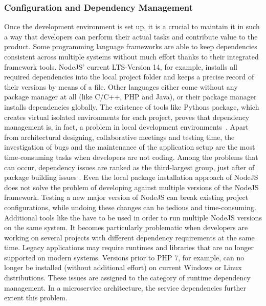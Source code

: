        \subsubsection{Configuration and Dependency Management}\label{sssec::dependency}
        Once the development environment is set up, it is a crucial to maintain it in such a way that developers can perform their actual tasks and contribute value to the product. Some programming language frameworks are able to keep dependencies consistent across multiple systems without much effort thanks to their integrated framework tools. NodeJS' current \ac{LTS}-Version 14, for example, installs all required dependencies into the local project folder and keeps a precise record of their versions by means of a  file. Other languages either come without any package manager at all (like C/C++, PHP and Java), or their package manager installs dependencies globally. The existence of tools like Pythons  package, which creates virtual isolated environments for each project, proves that dependency management is, in fact, a problem in local development environments~\cite{pythonvenv}. Apart from architectural designing, collaborative meetings and testing time, the investigation of bugs and the maintenance of the application setup are the most time-consuming tasks when developers are not coding. Among the problems that can occur, dependency issues are ranked as the third-largest group, just after of package building issues \cite{setuppain}.\newline
        Even the local package installation approach of NodeJS does not solve the problem of developing against multiple versions of the NodeJS framework. Testing a new major version of NodeJS can break existing project configurations, while undoing these changes can be tedious and time-consuming. Additional tools like the  have to be used in order to run multiple NodeJS versions on the same system. It becomes particularly problematic when developers are working on several projects with different dependency requirements at the same time. Legacy applications may require runtimes and libraries that are no longer supported on modern systems. Versions prior to PHP 7, for example, can no longer be installed (without additional effort) on current Windows or Linux distributions. These issues are assigned to the category of runtime dependency management. In a microservice architecture, the service dependencies further extent this problem. \newline
